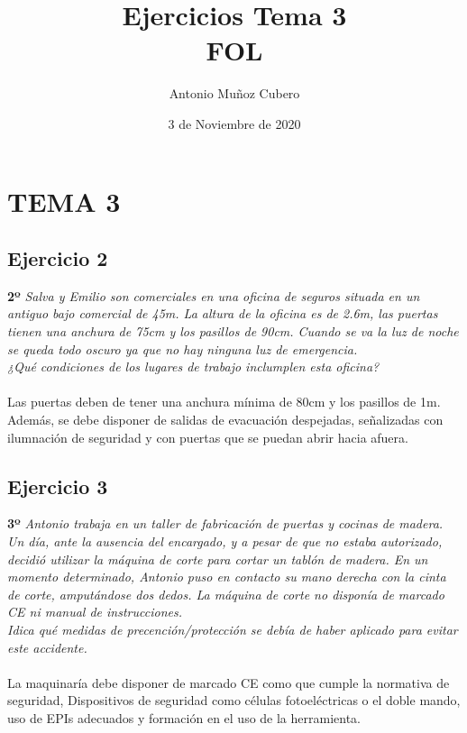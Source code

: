 \documentclass{article}
\title{Ejercicios Tema 3 \\ \textbf{FOL}}
\author{Antonio Muñoz Cubero}
\date{3 de Noviembre de 2020}
\begin{document}
  \maketitle
    \tableofcontents
        

  \newpage
    \section{TEMA 3}
      \subsection{Ejercicio 2}
        \textbf{2º} \textit{Salva y Emilio son comerciales en una oficina de seguros situada en un antiguo bajo comercial de 45m. 
        La altura de la oficina es de 2.6m, las puertas tienen una anchura de 75cm y los pasillos de 90cm. Cuando se va la luz de 
        noche se queda todo oscuro ya que no hay ninguna luz de emergencia. \\
        \textit{¿Qué condiciones de los lugares de trabajo inclumplen 
        esta oficina?}}
        \\\\
        Las puertas deben de tener una anchura mínima de 80cm y los pasillos de 1m. Además, se debe disponer de salidas de 
        evacuación despejadas, señalizadas con ilumnación de seguridad y con puertas que se puedan abrir hacia afuera.

      \subsection{Ejercicio 3}
        \textbf{3º} \textit{Antonio trabaja en un taller de fabricación de puertas y cocinas de madera. Un día, ante la ausencia 
        del encargado, y a pesar de que no estaba autorizado, decidió utilizar la máquina de corte para cortar un tablón de madera. 
        En un momento determinado, Antonio puso en contacto su mano derecha con la cinta de corte, amputándose dos dedos. La máquina 
        de corte no disponía de marcado CE ni manual de instrucciones.}\\
        \textit{Idica qué medidas de precención/protección se debía de haber aplicado para evitar este accidente.}
        \\\\
        La maquinaría debe disponer de marcado CE como que cumple la normativa de seguridad, Dispositivos de seguridad como células 
        fotoeléctricas o el doble mando, uso de EPIs adecuados y formación en el uso de la herramienta.
\end{document}
